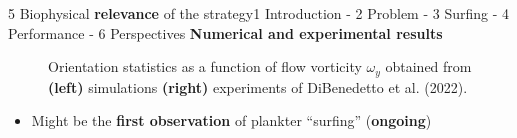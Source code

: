 \begin{frame}{5 Biophysical \textbf{relevance} of the strategy}{1 Introduction - 2 Problem - 3 Surfing - 4 Performance - 6 Perspectives}
	\centering
	\vspace{5pt}
	\textbf{\large Numerical and experimental results}

	\vspace{-5pt}
	\begin{figure}
		
		\captionsetup{skip=0pt}%
		\caption{
			Orientation statistics as a function of flow vorticity $\omega_y$ obtained from \textbf{(left)} simulations \textbf{(right)} experiments of DiBenedetto et al. (2022).
		}
	\end{figure}

	\vspace{-10pt}
	\begin{itemize}
		\item<3-> Might be the \textbf{first observation} of plankter ``surfing'' (\textbf{ongoing})
	\end{itemize}
\end{frame}













% 
% 
